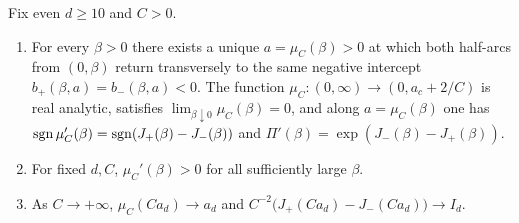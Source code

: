 \begin{lemma}[Global matching curve for $F(x)=C(x^d+x^{d-1}-ax)$]\label{lem:trinomial-curve}
Fix even $d\ge 10$ and $C>0$.
\begin{enumerate}
  \item[\textup{(i)}] For every $\beta>0$ there exists a unique $a=\mu_C(\beta)>0$ at which both
  half-arcs from $(0,\beta)$ return transversely to the same negative intercept
  $b_+(\beta,a)=b_-(\beta,a)<0$. The function $\mu_C:(0,\infty)\to(0,a_c+2/C)$ is real analytic,
  satisfies $\lim_{\beta\downarrow 0}\mu_C(\beta)=0$, and along $a=\mu_C(\beta)$ one has
  $\operatorname{sgn}\mu_C'(\beta)=\operatorname{sgn}(J_+(\beta)-J_-(\beta))$ and $\Pi'(\beta)=\exp(J_-(\beta)-J_+(\beta))$.
  \item[\textup{(ii)}] For fixed $d,C$, $\mu_C'(\beta)>0$ for all sufficiently large $\beta$.
  \item[\textup{(iii)}] As $C\to+\infty$, $\mu_C(Ca_d)\to a_d$ and $C^{-2}\bigl(J_+(Ca_d)-J_-(Ca_d)\bigr)\to I_d$.
\end{enumerate}
\end{lemma}

